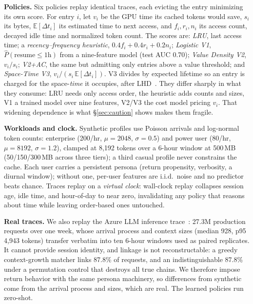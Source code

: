 \documentclass{article}
\begin{document}
\textbf{Policies.} Six policies replay identical traces, each evicting the entry minimizing its own score. For entry $i$, let $v_i$ be the GPU time its cached tokens would save, $s_i$ its bytes, $\mathbb{E}[\Delta t_i]$ its estimated time to next access, and $f_i, r_i, n_i$ its access count, decayed idle time and normalized token count. The scores are: \emph{LRU}, last access time; a
\emph{recency--frequency heuristic}, $0.4f_i + 0.4r_i + 0.2n_i$; \emph{Logistic V1},
$\hat{P}(\text{resume} \le 1\text{h})$ from a nine-feature model (test AUC 0.70);
\emph{Value Density V2}, $v_i/s_i$; \emph{V2+AC}, the same but admitting only entries
above a value threshold; and \emph{Space-Time V3}, $v_i/(s_i\,\mathbb{E}[\Delta t_i])$.
V3 divides by expected lifetime so an entry is charged for the space-\emph{time} it occupies, after LHD~\cite{beckmann2018lhd}. They differ sharply in what they consume: LRU needs only access order, the heuristic adds counts and sizes, V1 a trained model over nine features, V2/V3 the cost model pricing $v_i$. That widening dependence is what \S\ref{sec:caution} shows makes them fragile.

\textbf{Workloads and clock.} Synthetic profiles use Poisson arrivals and log-normal token counts: enterprise (200/hr, $\mu{=}2048$, $\sigma{=}0.5$) and power user (80/hr, $\mu{=}8192$, $\sigma{=}1.2$), clamped at 8{,}192 tokens over a 6-hour window at 500\,MB (50/150/300\,MB across three tiers); a third casual profile never constrains the cache. Each user carries a persistent persona (return propensity, verbosity, a diurnal window); without one, per-user features are i.i.d.\ noise and no predictor beats chance. Traces replay on a \emph{virtual clock}: wall-clock replay collapses session age, idle time, and hour-of-day to near zero, invalidating any policy that reasons about time while leaving order-based ones untouched.

\textbf{Real traces.} We also replay the Azure LLM inference trace~\cite{azurepublicdataset,stojkovic2025dynamollm}: 27.3M production requests over one week, whose arrival process and context sizes (median 928, p95 4{,}943 tokens) transfer verbatim into ten 6-hour windows used as paired replicates. It cannot provide session identity, and linkage is not reconstructable: a greedy context-growth matcher links 87.8\% of requests, and an indistinguishable 87.8\% under a permutation control that destroys all true chains. We therefore impose return behavior with the same persona machinery, so differences from synthetic come from the arrival process and sizes, which are real. The learned policies run zero-shot.
\end{document}
